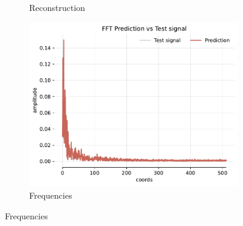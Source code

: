 \begin{figure}[h]
\begin{subfigure}[b]{0.32\textwidth}
        \caption{Reconstruction}
    \end{subfigure}
    \begin{subfigure}[b]{0.32\textwidth}
        \centering
        \includegraphics[width=\textwidth]{img/ch3/fft-noise-hf4096-w512.pdf}
        \caption{Frequencies}
    \end{subfigure}


\end{figure}
